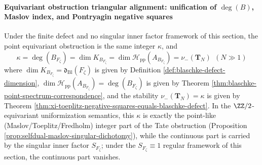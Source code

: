 \paragraph{Equivariant obstruction triangular alignment: unification of \texorpdfstring{$\deg(B)$}{deg(B)}, Maslov index, and Pontryagin negative squares}
\begin{theorem}\label{thm:xi-tate-maslov-pontryagin-unification}
Under the finite defect and no singular inner factor framework of this section, the point equivariant obstruction is the same integer \(\kappa\), and
\[
\boxed{\;
\kappa=\deg(B_{F_{\zeta}})
=\dim K_{B_{F_{\zeta}}}
=\dim\mathcal{H}_{\mathrm{pp}}(A_{B_{F_{\zeta}}})
=\nu_-(\mathbf{T}_N)\ \ (N\gg 1)\;}
\]
where \(\dim K_{B_{F_{\zeta}}}=\mathfrak d_{\mathrm{Bl}}(F_{\zeta})\) is given by Definition \ref{def:blaschke-defect-dimension},
\(\dim\mathcal{H}_{\mathrm{pp}}(A_{B_{F_{\zeta}}})=\deg(B_{F_{\zeta}})\) is given by Theorem \ref{thm:blaschke-point-spectrum-correspondence},
and the stability \(\nu_-(\mathbf{T}_N)=\kappa\) is given by Theorem \ref{thm:xi-toeplitz-negative-squares-equals-blaschke-defect}.
In the \(\ZZ/2\)-equivariant uniformization semantics, this \(\kappa\) is exactly the point-like (Maslov/Toeplitz/Fredholm) integer part of the Tate obstruction (Proposition \ref{prop:selfdual-maslov-singular-dichotomy}), while the continuous part is carried by the singular inner factor \(S_{F_{\zeta}}\); under the \(S_{F_{\zeta}}\equiv 1\) regular framework of this section, the continuous part vanishes.
\end{theorem}
\endinput










